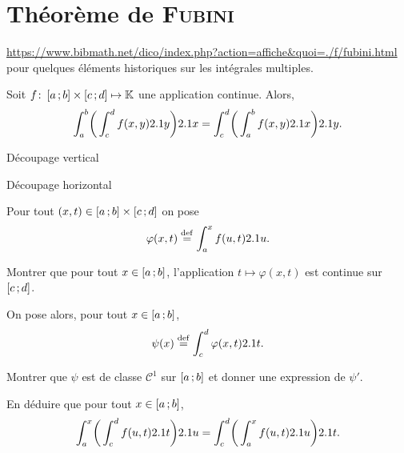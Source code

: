 \section{Théorème de \textsc{Fubini}}

\url{https://www.bibmath.net/dico/index.php?action=affiche&quoi=./f/fubini.html} pour quelques éléments historiques sur les intégrales multiples. 

\begin{theo}
    Soit $\fonctionligne[f]{\interff{a}{b} \times \interff{c}{d}}{\K}$ une application continue. Alors,
    \[
    \int_{a}^{b} \mathopen{}\bigg( \int_{c}^{d} f(x,y) \d y \bigg) \d x = \int_{c}^{d} \mathopen{}\bigg( \int_{a}^{b} f(x,y) \d x \bigg) \d y.
    \]
\end{theo}

\begin{marginfigure}[0cm]
    \centering
    
    \caption{Découpage vertical}
\end{marginfigure}
\begin{marginfigure}[5cm]
    \centering
    
    \caption{Découpage horizontal}
\end{marginfigure}

\begin{exercice}
    Pour tout $(x, t) \in \interff{a}{b} \times \interff{c}{d}$ on pose 
    $$\varphi(x, t) \defeq \int_{a}^{x} f(u, t) \d u.$$
    \begin{questions}
    \item Montrer que pour tout $x \in \interff{a}{b}$, l'application $t \mapsto \varphi(x, t)$ est continue sur $\interff{c}{d}$.
    \end{questions}

    On pose alors, pour tout $x  \in \interff{a}{b}$,
    $$\psi(x) \defeq \int_{c}^{d} \varphi(x, t) \d t.$$
    \begin{questions}[resume]
        \item Montrer que $\psi$ est de classe $\mathscr{C}^1$ sur $\interff{a}{b}$ et donner une expression de $\psi'$.
        \item En déduire que pour tout $x \in \interff{a}{b}$,
        \[
        \int_{a}^{x} \mathopen{}\bigg( \int_{c}^{d} f(u,t) \d t \bigg) \d u = \int_{c}^{d} \mathopen{}\bigg( \int_{a}^{x} f(u,t) \d u \bigg) \d t.
        \]
    \end{questions}
\end{exercice}

